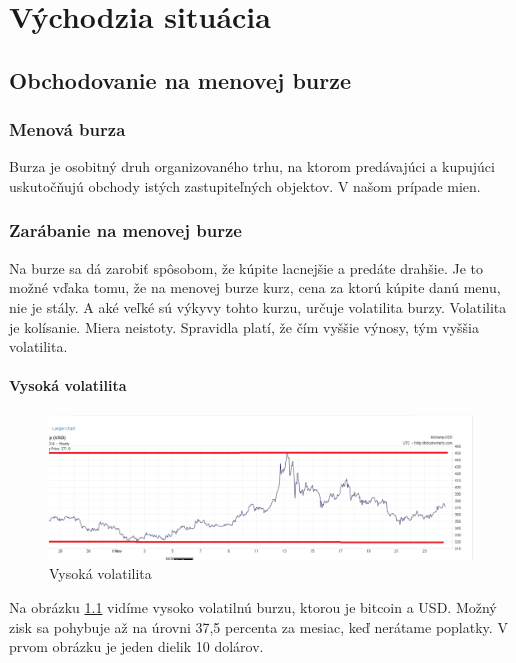 \chapter{Východzia situácia}\label{chap:intro} 
\section{Obchodovanie na menovej burze}
\subsection{Menová burza}  
Burza je osobitný druh organizovaného trhu, na ktorom predávajúci a kupujúci uskutočňujú obchody istých zastupiteľných objektov. V našom prípade mien.
\subsection{Zarábanie na menovej burze}
Na burze sa dá zarobiť spôsobom, že kúpite lacnejšie a predáte drahšie. Je to možné vďaka tomu, že na menovej burze kurz, cena za ktorú kúpite danú menu, nie je stály. A aké veľké sú výkyvy tohto kurzu, určuje volatilita burzy.
Volatilita\cite{Volatilita} je kolísanie. Miera neistoty. Spravidla platí, že čím vyššie výnosy, tým vyššia volatilita. 
\subsubsection{Vysoká volatilita}
\begin{figure}[!hbt]
\begin{center}
\includegraphics[width=1\textwidth]{obr}
\caption{Vysoká volatilita}
\label{img:vvolat}
\end{center}
\end{figure}
Na obrázku \ref{img:vvolat}  vidíme vysoko volatilnú burzu, ktorou je bitcoin a USD. Možný zisk sa pohybuje až na úrovni 37,5 percenta za mesiac, keď nerátame poplatky. V prvom obrázku je jeden dielik 10 dolárov.   
